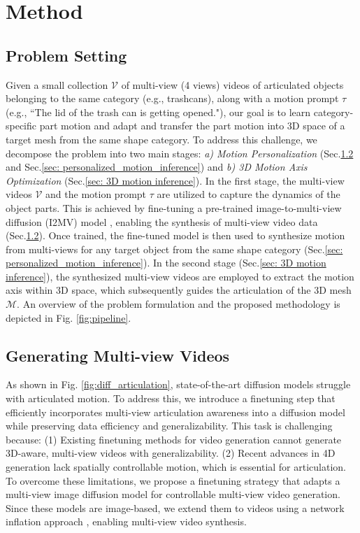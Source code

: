 \section{Method}
\label{method}
  

\subsection{Problem Setting}
\label{sec:problem setting}
Given a small collection $\mathcal{V}$ of multi-view (4 views) videos of articulated objects belonging to the same category (e.g., trashcans), along with a motion prompt $\tau$ (e.g., ``The lid of the trash can is getting opened."), our goal is to learn category-specific part motion and adapt and transfer the part motion into 3D space of a target mesh from the same shape category. To address this challenge, we decompose the problem into two main stages: \textit{a) Motion Personalization} (Sec.\ref{sec:ft_for_mv_video-gen} and Sec.\ref{sec: personalized_motion_inference}) and \textit{b) 3D Motion Axis Optimization} (Sec.\ref{sec: 3D motion inference}). In the first stage, the multi-view videos $\mathcal{V}$ and the motion prompt $\tau$ are utilized to capture the dynamics of the object parts. This is achieved by fine-tuning a pre-trained image-to-multi-view diffusion (I2MV) model \cite{wang2023imagedream}, enabling the synthesis of multi-view video data (Sec.\ref{sec:ft_for_mv_video-gen}). Once trained, the fine-tuned model is then used to synthesize motion from multi-views for any target object from the same shape category (Sec.\ref{sec: personalized_motion_inference}). In the second stage (Sec.\ref{sec: 3D motion inference}), the synthesized multi-view videos are employed to extract the motion axis within 3D space, which subsequently guides the articulation of the 3D mesh $\mathcal{M}$. An overview of the problem formulation and the proposed methodology is depicted in Fig. \ref{fig:pipeline}. 

\subsection{Generating Multi-view Videos} 
\label{sec:ft_for_mv_video-gen}
As shown in Fig. \ref{fig:diff_articulation}, state-of-the-art diffusion models struggle with articulated motion. To address this, we introduce a finetuning step that efficiently incorporates multi-view articulation awareness into a diffusion model while preserving data efficiency and generalizability. This task is challenging because: (1) Existing finetuning methods for video generation \cite{tuneavideo, qi2023fatezero, zhao2024motiondirector} cannot generate 3D-aware, multi-view videos with generalizability. (2) Recent advances in 4D generation \cite{zhang20244diffusion, li2024vivid} lack spatially controllable motion, which is essential for articulation. To overcome these limitations, we propose a finetuning strategy that adapts a multi-view image diffusion model \cite{wang2023imagedream} for controllable multi-view video generation. Since these models are image-based, we extend them to videos using a network inflation approach \citep{FLATTEN, tuneavideo}, enabling multi-view video synthesis.

